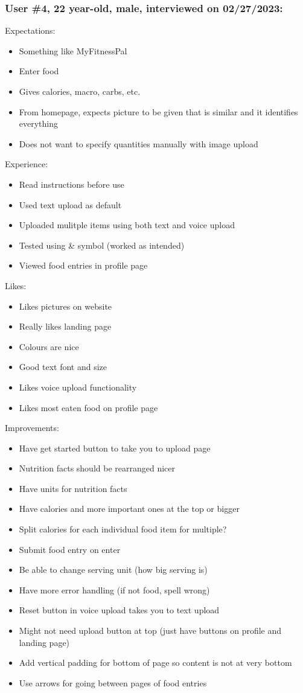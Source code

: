 \documentclass[12pt, titlepage]{article}
\begin{document}
	\subsubsection*{User \#4, 22 year-old, male, interviewed on 02/27/2023:}
	Expectations:
	\begin{itemize}
		\item Something like MyFitnessPal
		\item Enter food
		\item Gives calories, macro, carbs, etc.
		\item From homepage, expects picture to be given that is similar and it identifies everything
		\item Does not want to specify quantities manually with image upload
	\end{itemize}
	Experience:
	\begin{itemize}
		\item Read instructions before use
		\item Used text upload as default
		\item Uploaded mulitple items using both text and voice upload
		\item Tested using \& symbol (worked as intended)
		\item Viewed food entries in profile page
	\end{itemize}
	Likes:
	\begin{itemize}
		\item Likes pictures on website
		\item Really likes landing page
		\item Colours are nice
		\item Good text font and size
		\item Likes voice upload functionality
		\item Likes most eaten food on profile page
	\end{itemize}
	Improvements:
	\begin{itemize}
		\item Have get started button to take you to upload page
		\item Nutrition facts should be rearranged nicer
		\item Have units for nutrition facts
		\item Have calories and more important ones at the top or bigger
		\item Split calories for each individual food item for multiple?
		\item Submit food entry on enter
		\item Be able to change serving unit (how big serving is)
		\item Have more error handling (if not food, spell wrong)
		\item Reset button in voice upload takes you to text upload
		\item Might not need upload button at top (just have buttons on profile and landing page)
		\item Add vertical padding for bottom of page so content is not at very bottom
		\item Use arrows for going between pages of food entries
	\end{itemize}
\end{document}
